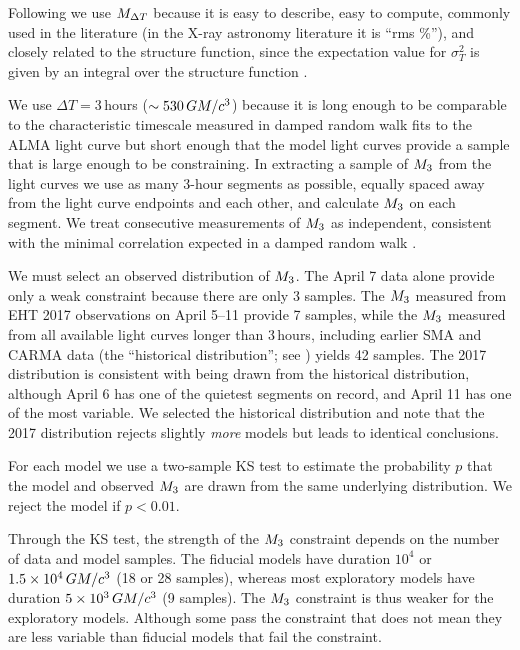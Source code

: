 Following \citet{2015ApJ...812..103C} we use $M_{\Delta T}$ because it is easy to describe, easy to compute, commonly used in the literature (in the X-ray astronomy literature it is ``rms \%''), and closely related to the structure function, since the expectation value for $\sigma_T^2$ is given by an integral over the structure function \citep[see][]{Lee_2022}.

We use $\Delta T = 3$\,hours ($\sim 530\,GM/c^3$) because it is long enough to be comparable to the characteristic timescale measured in damped random walk fits to the ALMA light curve \citep[see Table 10 of][]{Wielgus2022} but short enough that the model light curves provide a sample that is large enough to be constraining.
In extracting a sample of $M_{3}$ from the light curves we use as many 3-hour segments as possible, equally spaced away from the light curve endpoints and each other, and calculate $M_{3}$ on each segment.
We treat consecutive measurements of $M_{3}$ as independent, consistent with the minimal correlation expected in a damped random walk \citep{Lee_2022}.

We must select an observed distribution of $M_{3}$.
The April 7 data alone provide only a weak constraint because there are only 3 samples.
The $M_{3}$ measured from EHT 2017 observations on April 5--11 provide 7 samples, while the $M_{3}$ measured from all available light curves longer than 3\,hours, including earlier SMA and CARMA data (the ``historical distribution''; see \citealt{Wielgus2022}) yields 42 samples.
The 2017 distribution is consistent with being drawn from the historical distribution, although April 6 has one of the quietest segments on record, and April 11 has one of the most variable.
We selected the historical distribution and note that the 2017 distribution rejects slightly {\em more} models but leads to identical conclusions.

For each model we use a two-sample KS test to estimate the probability $p$ that the model and observed $M_{3}$ are drawn from the same underlying distribution.
We reject the model if $p < 0.01$.

Through the KS test, the strength of the $M_{3}$ constraint depends on the number of data and model samples.
The fiducial models have duration $10^4$ or $1.5\times 10^4\,GM/c^3$ (18 or 28 samples), whereas most exploratory models have duration $5 \times 10^3\,GM/c^3$ (9 samples).
The $M_{3}$ constraint is thus weaker for the exploratory models.
Although some pass the constraint that does not mean they are less variable than fiducial models that fail the constraint.

